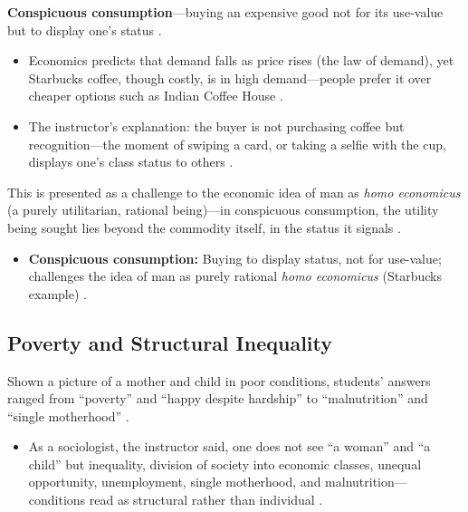 \begin{KeyConcept}
\textbf{Conspicuous consumption}---buying an expensive good not for its use-value but to display one's status .
\begin{itemize}
    \item Economics predicts that demand falls as price rises (the law of demand), yet Starbucks coffee, though costly, is in high demand---people prefer it over cheaper options such as Indian Coffee House .
    \item The instructor's explanation: the buyer is not purchasing coffee but recognition---the moment of swiping a card, or taking a selfie with the cup, displays one's class status to others .
\end{itemize}
This is presented as a challenge to the economic idea of man as \textit{homo economicus} (a purely utilitarian, rational being)---in conspicuous consumption, the utility being sought lies beyond the commodity itself, in the status it signals .
\end{KeyConcept}

\begin{QuickRevision}
\begin{itemize}
    \item \textbf{Conspicuous consumption:} Buying to display status, not for use-value; challenges the idea of man as purely rational \textit{homo economicus} (Starbucks example) .
\end{itemize}
\end{QuickRevision}

\subsection{Poverty and Structural Inequality}
Shown a picture of a mother and child in poor conditions, students' answers ranged from ``poverty'' and ``happy despite hardship'' to ``malnutrition'' and ``single motherhood'' .

\begin{KeyConcept}
\begin{itemize}
    \item As a sociologist, the instructor said, one does not see ``a woman'' and ``a child'' but inequality, division of society into economic classes, unequal opportunity, unemployment, single motherhood, and malnutrition---conditions read as structural rather than individual .
\end{itemize}
\end{KeyConcept}

